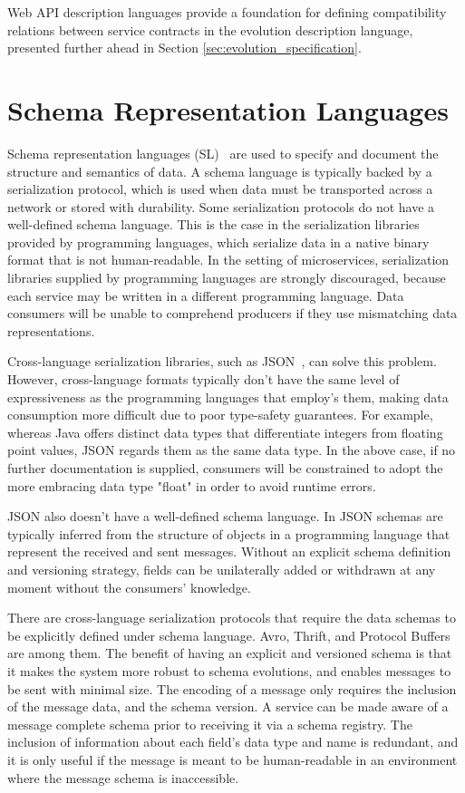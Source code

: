 Web API description languages provide a foundation for defining compatibility relations between service contracts in the evolution description language,
presented further ahead in Section \ref{sec:evolution_specification}.

\section{Schema Representation Languages} %
\label{sec:schema_representation_languages}

Schema representation languages (SL)~\cite{schemalanguagetaxonomy} are used to specify and document the structure and semantics of data.
A schema language is typically backed by a serialization protocol, which is used when data must be transported across a network or stored with durability.
Some serialization protocols do not have a well-defined schema language.
This is the case in the serialization libraries provided by programming languages, which serialize data in a native binary format that is not human-readable.
In the setting of microservices, serialization libraries supplied by programming languages are strongly discouraged,
because each service may be written in a different programming language.
Data consumers will be unable to comprehend producers if they use mismatching data representations.

Cross-language serialization libraries, such as JSON~\cite{json}, can solve this problem.
However, cross-language formats typically don't have the same level of expressiveness as the programming languages that employ's them,
making data consumption more difficult due to poor type-safety guarantees.
For example, whereas Java offers distinct data types that differentiate integers from floating point values, JSON regards them as the same data type.
In the above case, if no further documentation is supplied, consumers will be constrained to adopt the more embracing data type "float" in order to avoid runtime errors.

JSON also doesn't have a well-defined schema language.
In JSON schemas are typically inferred from the structure of objects in a programming language that represent the received and sent messages.
Without an explicit schema definition and versioning strategy, fields can be unilaterally added or withdrawn at any moment without the consumers' knowledge.

There are cross-language serialization protocols that require the data schemas to be explicitly defined under schema language.
Avro, Thrift, and Protocol Buffers~\cite{8,9,10} are among them.
The benefit of having an explicit and versioned schema is that it makes the system more robust to schema evolutions, and
enables messages to be sent with minimal size.
The encoding of a message only requires the inclusion of the message data, and the schema version.
A service can be made aware of a message complete schema prior to receiving it via a schema registry.
The inclusion of information about each field's data type and name is redundant,
and it is only useful if the message is meant to be human-readable in an environment where the message schema is inaccessible.

